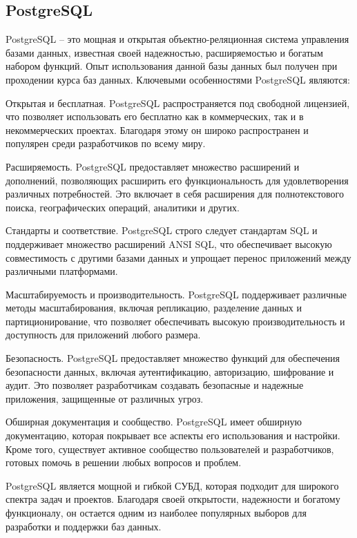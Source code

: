\subsection{PostgreSQL}\label{subsec:domain:postgresql}
PostgreSQL\cite{postgres_docs} -- это мощная и открытая объектно-реляционная система управления базами данных, известная своей надежностью, расширяемостью и богатым набором функций.
Опыт использования данной базы данных был получен при проходении курса баз данных.
Ключевыми особенностями PostgreSQL являются:
\begin{enumerate_num}
    \item Открытая и бесплатная.
    PostgreSQL распространяется под свободной лицензией, что позволяет использовать его бесплатно как в коммерческих, так и в некоммерческих проектах.
    Благодаря этому он широко распространен и популярен среди разработчиков по всему миру.
    \item Расширяемость.
    PostgreSQL предоставляет множество расширений и дополнений, позволяющих расширить его функциональность для удовлетворения различных потребностей.
    Это включает в себя расширения для полнотекстового поиска, географических операций, аналитики и других.
    \item Стандарты и соответствие.
    PostgreSQL строго следует стандартам SQL и поддерживает множество расширений ANSI SQL, что обеспечивает высокую совместимость с другими базами данных и упрощает перенос приложений между различными платформами.
    \item Масштабируемость и производительность.
    PostgreSQL поддерживает различные методы масштабирования, включая репликацию, разделение данных и партиционирование, что позволяет обеспечивать высокую производительность и доступность для приложений любого размера.
    \item Безопасность.
    PostgreSQL предоставляет множество функций для обеспечения безопасности данных, включая аутентификацию, авторизацию, шифрование и аудит.
    Это позволяет разработчикам создавать безопасные и надежные приложения, защищенные от различных угроз.
    \item Обширная документация и сообщество.
    PostgreSQL имеет обширную документацию, которая покрывает все аспекты его использования и настройки.
    Кроме того, существует активное сообщество пользователей и разработчиков, готовых помочь в решении любых вопросов и проблем.
\end{enumerate_num}

PostgreSQL является мощной и гибкой СУБД, которая подходит для широкого спектра задач и проектов.
Благодаря своей открытости, надежности и богатому функционалу, он остается одним из наиболее популярных выборов для разработки и поддержки баз данных.

